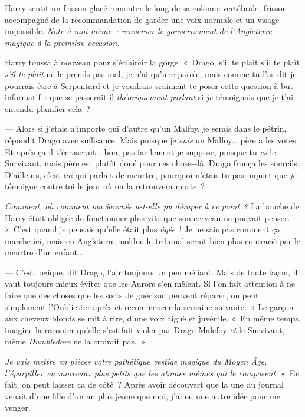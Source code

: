 Harry sentit un frisson glacé remonter le long de sa colonne vertébrale, frisson accompagné de la recommandation de garder une voix normale et un visage impassible.
\emph{Note à moi-même~: renverser le gouvernement de l'Angleterre magique à la première occasion.}

Harry toussa à nouveau pour s'éclaircir la gorge.
«~Drago, s'il te plaît s'il te plaît \emph{s'il te plaît} ne le prends pas mal, je n'ai qu'une parole, mais comme tu l'as dit je pourrais être à Serpentard et je voudrais vraiment te poser cette question à but informatif~: que se passerait-il \emph{théoriquement parlant} si \emph{je} témoignais que je t'ai entendu planifier cela~?

--- Alors si j'étais n'importe qui d'autre qu'un Malfoy, je serais dans le pétrin, répondit Drago avec suffisance.
Mais puisque je \emph{suis} un Malfoy… père a les votes.
Et après ça il t'écraserait… bon, pas facilement je suppose, puisque tu \emph{es} le Survivant, mais père est plutôt doué pour ces choses-là.
Drago fronça les sourcils.
D'ailleurs, c'est \emph{toi} qui parlait de meurtre, pourquoi n'étais-tu pas inquiet que \emph{je} témoigne contre toi le jour où on la retrouvera morte~?

\emph{Comment, oh comment ma journée a-t-elle pu déraper à ce point~?}
La bouche de Harry était obligée de fonctionner plus vite que son cerveau ne pouvait penser.
«~C'est quand je pensais qu'elle était plus \emph{âgée}~! Je ne sais pas comment ça marche ici, mais en Angleterre moldue le tribunal serait bien plus contrarié par le meurtre d'un enfant…

--- C'est logique, dit Drago, l'air toujours un peu méfiant.
Mais de toute façon, il vaut toujours mieux éviter que les Aurors s'en mêlent.
Si l'on fait attention à ne faire que des choses que les sorts de guérison peuvent réparer, on peut simplement l'Oublietter après et recommencer la semaine suivante.~»
Le garçon aux cheveux blonds se mit à rire, d'une voix aiguë et juvénile.
«~En même temps, imagine-la raconter qu'elle s'est fait violer par Drago Malefoy \emph{et} le Survivant, même \emph{Dumbledore} ne la croirait pas.~»

\emph{Je vais mettre en pièces votre pathétique vestige magique du Moyen Âge, l'éparpiller en morceaux plus petits que les atomes mêmes qui le composent.}
«~En fait, on peut laisser ça de côté~? Après avoir découvert que la une du journal venait d'une fille d'un an plus jeune que moi, j'ai eu une autre idée pour me venger.

